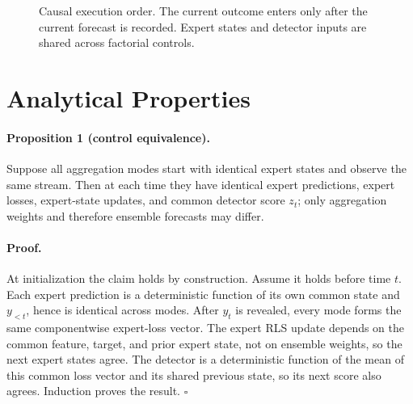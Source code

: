 \documentclass[10pt]{article}
\begin{document}
\begin{figure}[t]
\centering
{}
\caption{Causal execution order. The current outcome enters only after the current
forecast is recorded. Expert states and detector inputs are shared across factorial
controls.}
\label{fig:pipeline}
\end{figure}

\section{Analytical Properties}

\paragraph{Proposition 1 (control equivalence).}
Suppose all aggregation modes start with identical expert states and observe the
same stream. Then at each time they have identical expert predictions, expert losses,
expert-state updates, and common detector score $z_t$; only aggregation weights and
therefore ensemble forecasts may differ.

\paragraph{Proof.}
At initialization the claim holds by construction. Assume it holds before time $t$.
Each expert prediction is a deterministic function of its own common state and
$y_{<t}$, hence is identical across modes. After $y_t$ is revealed, every mode forms
the same componentwise expert-loss vector. The expert RLS update depends on the
common feature, target, and prior expert state, not on ensemble weights, so the next
expert states agree. The detector is a deterministic function of the mean of this
common loss vector and its shared previous state, so its next score also agrees.
Induction proves the result. \(\square\)
\end{document}
